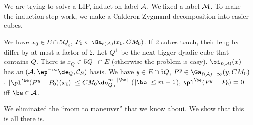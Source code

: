 
We are trying to solve a LIP, induct on label $\cal A$. We fixed a label $\cal M$. To make the induction step work, we make a Calderon-Zygmund decomposition into easier cubes.

We have $x_0\in E\cap 5Q_0$, $P_0\in \Ga_{\ell(\cal A)} (x_0,CM_0)$. If 2 cubes touch, their lengths differ by at most a factor of 2. Let $Q^+$ be the next bigger dyadic cube that contains $Q$. There is $x_Q\in 5Q^+\cap E$ (otherwise the problem is easy). %
$\si_{\ell(\cal A)}(x)$ has an  $(\cal A,\ep^{-1}\de_{Q},C_B)$ basis.
We have $y\in E\cap 5Q$, $P^y\in \Ga_{\ell(\cal A)-1}(y,CM_0)$. 
$|\pl^\be (P^y-P_0)(x_0)|\le CM_0 \de_{Q_0}^{m-|\be|}$ ($|\be|\le m-1$), $\pl^\be (P^y-P_0) \equiv 0$ iff $\be \in \cal A$. 

We eliminated the ``room to maneuver'' that we know about. We show that this is all there is.

